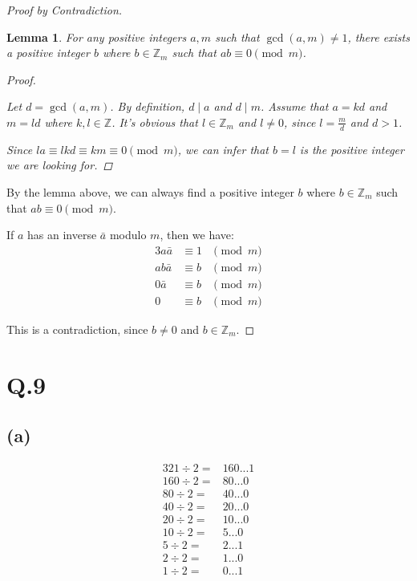 \documentclass[a4paper,12pt]{article}
\newtheorem{lemma}{Lemma}
\begin{document}
\begin{proof}[Proof by Contradiction]
$ $

\begin{lemma}
	For any positive integers $a,m$ such that $\gcd(a,m) \ne 1$, there exists a positive integer $b$ where $b \in \mathbb{Z}_m$ such that $ab \equiv 0 \pmod{m}$.

	\begin{proof}
	$ $

	Let $d = \gcd(a,m)$.
	By definition, $d \mid a$ and $d \mid m$.
	Assume that $a = kd$ and $m = ld$ where $k,l \in \mathbb{Z}$.
	It's obvious that $l \in \mathbb{Z}_m$ and $l \ne 0$, since $l = \frac{m}{d}$ and $d > 1$.

	Since $la \equiv lkd \equiv km \equiv 0 \pmod{m}$, we can infer that $b = l$ is the positive integer we are looking for.
	\end{proof}
\end{lemma}

By the lemma above, we can always find a positive integer $b$ where $b \in \mathbb{Z}_m$ such that $ab \equiv 0 \pmod{m}$.

If $a$ has an inverse $\bar{a}$ modulo $m$, then we have:
\begin{alignat*}{3}
	a \bar{a} &\equiv 1 &\pmod{m}\\
	ab \bar{a} &\equiv b &\pmod{m}\\
	0 \bar{a} &\equiv b &\pmod{m}\\
	0 &\equiv b &\pmod{m}
\end{alignat*}

This is a contradiction, since $b \ne 0$ and $b \in \mathbb{Z}_m$.
\end{proof}

\section*{Q.9}

\subsection*{(a)}

\begin{align*}
	321 \div 2 =& 160 ... 1 \\
	160 \div 2 =& 80 ... 0 \\
	80 \div 2 =& 40 ... 0 \\
	40 \div 2 =& 20 ... 0 \\
	20 \div 2 =& 10 ... 0 \\
	10 \div 2 =& 5 ... 0 \\
	5 \div 2 =& 2 ... 1 \\
	2 \div 2 =& 1 ... 0 \\
	1 \div 2 =& 0 ... 1
\end{align*}
\end{document}
